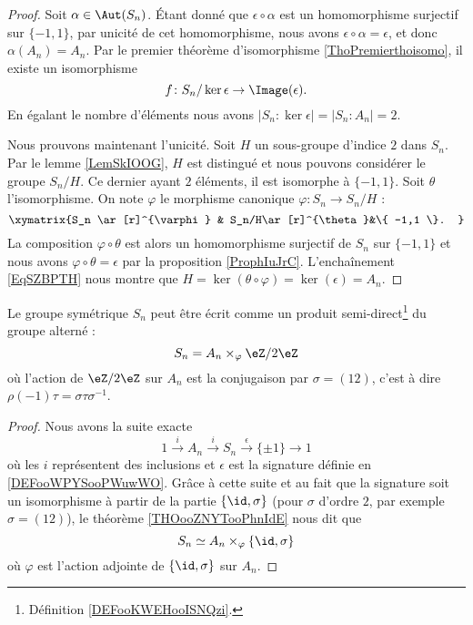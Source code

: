 \begin{proof}
    Soit \( \alpha\in \Aut(S_n)\). Étant donné que \( \epsilon\circ\alpha\) est un homomorphisme surjectif sur \( \{ -1,1 \}\), par unicité de cet homomorphisme, nous avons \( \epsilon\circ\alpha=\epsilon\), et donc \( \alpha(A_n)=A_n\). Par le premier théorème d'isomorphisme \ref{ThoPremierthoisomo}, il existe un isomorphisme
    \begin{equation}
        f\colon S_n/\ker\epsilon\to \Image(\epsilon).
    \end{equation}
    En égalant le nombre d'éléments nous avons \( | S_n:\ker\epsilon |=| S_n:A_n |=2\).

    Nous prouvons maintenant l'unicité. Soit \( H\) un sous-groupe d'indice \( 2\) dans \( S_n\). Par le lemme \ref{LemSkIOOG}, \( H\) est distingué et nous pouvons considérer le groupe \( S_n/H\). Ce dernier ayant \( 2\) éléments, il est isomorphe à \( \{ -1,1 \}\). Soit \( \theta\) l'isomorphisme. On note \( \varphi\) le morphisme canonique \( \varphi\colon S_n\to S_n/H\) :
    \begin{equation}    \label{EqSZBPTH}
        \xymatrix{%
        S_n \ar[r]^{\varphi}        &   S_n/H\ar[r]^{\theta}&\{ -1,1 \}.
           }
    \end{equation}
    La composition \( \varphi\circ \theta\) est alors un homomorphisme surjectif de \( S_n\) sur \( \{ -1,1 \}\) et nous avons \( \varphi\circ\theta=\epsilon\) par la proposition \ref{ProphIuJrC}. L'enchaînement \eqref{EqSZBPTH} nous montre que \( H=\ker(\theta\circ\varphi)=\ker(\epsilon)=A_n\).
\end{proof}

\begin{proposition}      \label{PROPooPSZVooSmAgPA}
    Le groupe symétrique \( S_n\) peut être écrit comme un produit semi-direct\footnote{Définition \ref{DEFooKWEHooISNQzi}.} du groupe alterné :
    \begin{equation}
        S_n=A_n\times_{\varphi}\eZ/2\eZ
    \end{equation}
    où l'action de \( \eZ/2\eZ\) sur \( A_n\) est la conjugaison par \( \sigma=(12)\), c'est à dire \( \rho(-1)\tau=\sigma\tau\sigma^{-1}\).
\end{proposition}

\begin{proof}
    Nous avons la suite exacte
    \begin{equation}
        1\stackrel{i}{\longrightarrow}A_n\stackrel{i}{\longrightarrow}S_n\stackrel{\epsilon}{\longrightarrow}\{ \pm 1 \}\longrightarrow 1
    \end{equation}
    où les \( i\) représentent des inclusions et \( \epsilon\) est la signature définie en \ref{DEFooWPYSooPWuwWO}. Grâce à cette suite et au fait que la signature soit un isomorphisme à partir de la partie \( \{ \id,\sigma \}\) (pour \( \sigma\) d'ordre \( 2\), par exemple \( \sigma=(12)\)), le théorème \ref{THOooZNYTooPhnIdE} nous dit que
    \begin{equation}
        S_n\simeq A_n\times_{\varphi}\{ \id,\sigma \}
    \end{equation}
    où \( \varphi\) est l'action adjointe de \( \{ \id,\sigma \}\) sur \( A_n\).
\end{proof}


